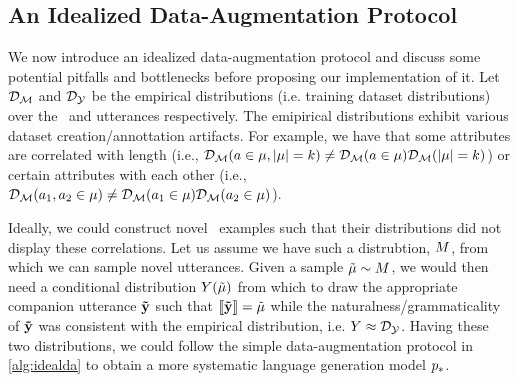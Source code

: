 \subsection{An Idealized Data-Augmentation Protocol}
\label{sec:ideal}

We now introduce an idealized data-augmentation protocol and discuss some
potential pitfalls and bottlenecks before proposing our implementation 
of it.
Let $\mathcal{D}_{\mathcal{M}}$ and $\mathcal{D}_{\mathcal{Y}}$
be the empirical distributions (i.e. training dataset distributions) over the \meaningrepresentations~and utterances
respectively. The emipirical distributions exhibit various dataset creation/annottation
artifacts. For example, we have that some attributes  are correlated
with length (i.e., $\mathcal{D}_{\mathcal{M}}(a \in \mu, {\left\vert \mu \right\vert} = k) \ne 
\mathcal{D}_{\mathcal{M}}(a \in \mu)\mathcal{D}_{\mathcal{M}}({\left\vert \mu \right\vert} = k)$) or 
certain attributes with each other
(i.e., $\mathcal{D}_{\mathcal{M}}(a_1, a_2 \in \mu) \ne 
\mathcal{D}_{\mathcal{M}}(a_1 \in \mu)\mathcal{D}_{\mathcal{M}}(a_2\in \mu)$).



Ideally, we could construct novel \meaningrepresentation~examples such that
their distributions did not display these correlations. Let us assume we
have such a distrubtion, $M$, from which we can sample novel
utterances. Given a sample $\tilde{\mu} \sim M$, we would then need
a conditional distribution $Y(\tilde{\mu})$ from which to 
draw the appropriate companion utterance $\boldsymbol{\tilde{\mathbf{y}}}$ such that $\left\llbracket \boldsymbol{\tilde{\mathbf{y}}} \right\rrbracket = \tilde{\mu}$ while the naturalness/grammaticality of $\boldsymbol{\tilde{\mathbf{y}}}$
was consistent with the empirical distribution, i.e. $Y \approx \mathcal{D}_{\mathcal{Y}}$. Having these two distributions, we could follow the
simple data-augmentation protocol in \autoref{alg:idealda} to obtain
a more systematic language generation model $p_*$.



